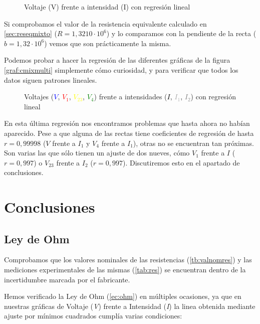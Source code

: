 \documentclass[12pt, a4paper, titlepage]{article}
\begin{document}
  \begin{figure}[H]
    \hspace{2.5em} 
    \caption{Voltaje (V) frente a intensidad (I) con regresión lineal}
  \end{figure}

  Si comprobamos el valor de la resistencia equivalente calculado en \ref{sec:reseqmixto} ($R = 1,3210 \cdot 10^6$) y lo comparamos con la pendiente de la recta ($b = 1,32 \cdot 10^6$) vemos que son prácticamente la misma.

  Podemos probar a hacer la regresión de las diferentes gráficas de la figura \ref{graf:cmixmulti} simplemente cómo curiosidad, y para verificar que todos los datos siguen patrones lineales.

  \begin{figure}[H]
    \centering
    
    
    
    \caption{Voltajes (\textcolor{Blue}{$V$}, \textcolor{Red}{$V_1$}, \textcolor{Yellow}{$V_{23}$}, \textcolor{Green}{$V_4$}) frente a intensidades (\textcolor{Black}{$I$}, \textcolor{DarkGrey}{$I_1$}, \textcolor{Grey}{$I_2$}) con regresión lineal}
  \end{figure}

  En esta última regresión nos encontramos problemas que hasta ahora no habían aparecido. Pese a que alguna de las rectas tiene coeficientes de regresión de hasta $r = 0,99998$ ($V$ frente a $I_1$ y $V_4$ frente a $I_1$), otras no se encuentran tan próximas. Son varias las que sólo tienen un ajuste de dos nueves, cómo $V_1$ frente a $I$ ($r = 0,997$) o $V_{23}$ frente a $I_2$ ($r = 0,997$). Discutiremos esto en el apartado de conclusiones.


  \newpage
  \section{Conclusiones}

  \subsection{Ley de Ohm}

  Comprobamos que los valores nominales de las resistencias (\ref{tb:valnomres}) y las mediciones experimentales de las mismas (\ref{tab:res}) se encuentran dentro de la incertidumbre marcada por el fabricante.

  Hemos verificado la Ley de Ohm (\ref{ec:ohm}) en múltiples ocasiones, ya que en nuestras gráficas de Voltaje (\textit{V}) frente a Intensidad (\textit{I}) la linea obtenida mediante ajuste por mínimos cuadrados cumplía varias condiciones:
\end{document}
